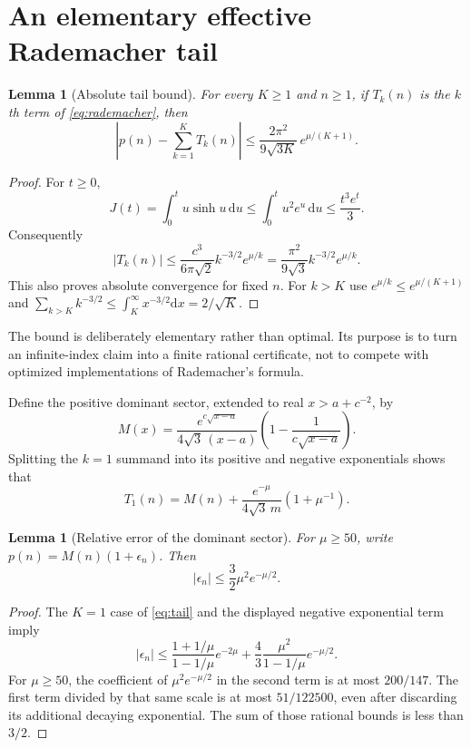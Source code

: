 \documentclass[11pt]{article}
\numberwithin{equation}{section}
\newtheorem{lemma}[theorem]{Lemma}
\theoremstyle{definition}
\theoremstyle{remark}
\newcommand{\dd}{\mathrm d}
\begin{document}
\section{An elementary effective Rademacher tail}\label{sec:tail}
\begin{lemma}[Absolute tail bound]\label{lem:tail}
For every $K\ge1$ and $n\ge1$, if $T_k(n)$ is the $k$th term of
\eqref{eq:rademacher}, then
\begin{equation}\label{eq:tail}
 \left|p(n)-\sum_{k=1}^K T_k(n)\right|
 \le\frac{2\pi^2}{9\sqrt{3K}}\,e^{\mu/(K+1)}.
\end{equation}
\end{lemma}
\begin{proof}
For $t\ge0$,
\[
 J(t)=\int_0^t u\sinh u\,\dd u
 \le\int_0^t u^2e^u\,\dd u\le\frac{t^3e^t}{3}.
\]
Consequently
\[
 |T_k(n)|\le\frac{c^3}{6\pi\sqrt2}
 k^{-3/2}e^{\mu/k}
 =\frac{\pi^2}{9\sqrt3}k^{-3/2}e^{\mu/k}.
\]
This also proves absolute convergence for fixed $n$. For $k>K$ use
$e^{\mu/k}\le e^{\mu/(K+1)}$ and
$\sum_{k>K}k^{-3/2}\le\int_K^\infty x^{-3/2}\dd x=2/\sqrt K$.
\end{proof}

The bound is deliberately elementary rather than optimal. Its purpose is
to turn an infinite-index claim into a finite rational certificate, not
to compete with optimized implementations of Rademacher's formula.

Define the positive dominant sector, extended to real $x>a+c^{-2}$, by
\begin{equation}\label{eq:M}
 M(x)=\frac{e^{c\sqrt{x-a}}}{4\sqrt3\,(x-a)}
 \left(1-\frac1{c\sqrt{x-a}}\right).
\end{equation}
Splitting the $k=1$ summand into its positive and negative exponentials
shows that
\[
 T_1(n)=M(n)+\frac{e^{-\mu}}{4\sqrt3\,m}(1+\mu^{-1}).
\]
\begin{lemma}[Relative error of the dominant sector]\label{lem:relative}
For $\mu\ge50$, write $p(n)=M(n)(1+\epsilon_n)$. Then
\begin{equation}\label{eq:epsilon}
 |\epsilon_n|\le\frac32\mu^2e^{-\mu/2}.
\end{equation}
\end{lemma}
\begin{proof}
The $K=1$ case of \eqref{eq:tail} and the displayed negative exponential
term imply
\begin{equation}\label{eq:epsilonprecise}
 |\epsilon_n|\le
 \frac{1+1/\mu}{1-1/\mu}e^{-2\mu}
 +\frac43\frac{\mu^2}{1-1/\mu}e^{-\mu/2}.
\end{equation}
For $\mu\ge50$, the coefficient of $\mu^2e^{-\mu/2}$ in the second
term is at most $200/147$. The first term divided by that same scale
is at most $51/122500$, even after discarding its additional decaying
exponential. The sum of those rational bounds is less than $3/2$.
\end{proof}
\end{document}
